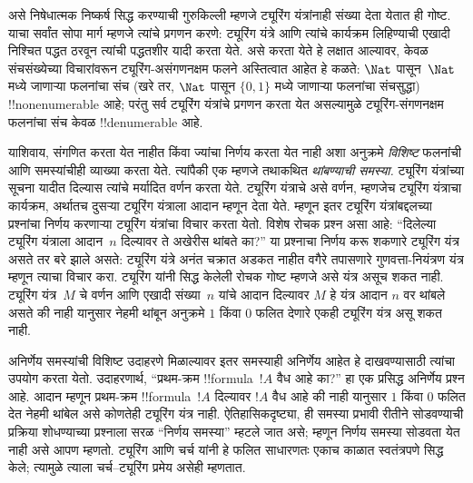 \documentclass[../../../include/open-logic-section]{subfiles}
\begin{document}
असे निषेधात्मक निष्कर्ष सिद्ध करण्याची गुरुकिल्ली म्हणजे
ट्यूरिंग यंत्रांनाही संख्या देता येतात ही गोष्ट. याचा
सर्वांत सोपा मार्ग म्हणजे त्यांचे प्रगणन करणे: ट्यूरिंग
यंत्रे आणि त्यांचे कार्यक्रम लिहिण्याची एखादी निश्चित
पद्धत ठरवून त्यांची पद्धतशीर यादी करता येते. असे
करता येते हे लक्षात आल्यावर, केवळ संचसंख्येच्या
विचारांवरून ट्यूरिंग-असंगणनक्षम फलने अस्तित्वात आहेत
हे कळते: $\Nat$ पासून~$\Nat$ मध्ये जाणाऱ्या फलनांचा
संच (खरे तर, $\Nat$ पासून $\{0, 1\}$ मध्ये जाणाऱ्या
फलनांचा संचसुद्धा) !!{nonenumerable}
आहे; परंतु सर्व ट्यूरिंग यंत्रांचे प्रगणन करता येत
असल्यामुळे ट्यूरिंग-संगणनक्षम फलनांचा संच केवळ
!!{denumerable} आहे.

याशिवाय, संगणित करता येत नाहीत किंवा ज्यांचा निर्णय
करता येत नाही अशा अनुक्रमे \emph{विशिष्ट} फलनांची
आणि समस्यांचीही व्याख्या करता येते. त्यांपैकी
एक म्हणजे तथाकथित \emph{थांबण्याची समस्या.}
ट्यूरिंग यंत्रांच्या सूचना यादीत दिल्यास त्यांचे
मर्यादित वर्णन करता येते. ट्यूरिंग यंत्राचे असे
वर्णन, म्हणजेच ट्यूरिंग यंत्राचा कार्यक्रम, अर्थातच
दुसऱ्या ट्यूरिंग यंत्राला आदान म्हणून देता येते.
म्हणून इतर ट्यूरिंग यंत्रांबद्दलच्या प्रश्नांचा
निर्णय करणाऱ्या ट्यूरिंग यंत्रांचा विचार करता येतो.
विशेष रोचक प्रश्न असा आहे: “दिलेल्या ट्यूरिंग यंत्राला
आदान~$n$ दिल्यावर ते अखेरीस थांबते का?”
या प्रश्नाचा निर्णय करू शकणारे ट्यूरिंग यंत्र असते
तर बरे झाले असते: ट्यूरिंग यंत्रे अनंत चक्रात अडकत
नाहीत वगैरे तपासणारे गुणवत्ता-नियंत्रण यंत्र म्हणून
त्याचा विचार करा. ट्यूरिंग यांनी सिद्ध केलेली
रोचक गोष्ट म्हणजे असे यंत्र असूच शकत नाही.
ट्यूरिंग यंत्र~$M$ चे वर्णन आणि एखादी
संख्या~$n$ यांचे आदान दिल्यावर $M$ हे यंत्र
आदान $n$ वर थांबले असते की नाही यानुसार नेहमी
थांबून अनुक्रमे $1$ किंवा $0$ फलित देणारे एकही
ट्यूरिंग यंत्र असू शकत नाही.

अनिर्णेय समस्यांची विशिष्ट उदाहरणे मिळाल्यावर इतर
समस्याही अनिर्णेय आहेत हे दाखवण्यासाठी त्यांचा
उपयोग करता येतो. उदाहरणार्थ, “प्रथम-क्रम
!!{formula}~$!A$ वैध आहे का?” हा एक प्रसिद्ध
अनिर्णेय प्रश्न आहे. आदान म्हणून प्रथम-क्रम
!!{formula}~$!A$ दिल्यावर $!A$ वैध आहे की
नाही यानुसार $1$ किंवा $0$ फलित देत नेहमी
थांबेल असे कोणतेही ट्यूरिंग यंत्र नाही.
ऐतिहासिकदृष्ट्या, ही समस्या प्रभावी रीतीने
सोडवण्याची प्रक्रिया शोधण्याच्या प्रश्नाला
सरळ “निर्णय समस्या” म्हटले जात असे; म्हणून
निर्णय समस्या सोडवता येत नाही असे आपण म्हणतो.
ट्यूरिंग आणि चर्च यांनी हे फलित साधारणतः
एकाच काळात स्वतंत्रपणे सिद्ध केले; त्यामुळे
त्याला चर्च--ट्यूरिंग प्रमेय असेही म्हणतात.
\end{document}
